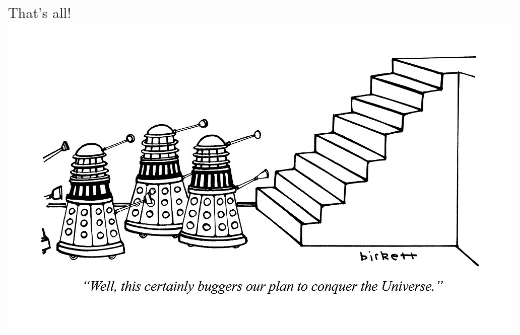 \documentclass{beamer}
\begin{document}
\begin{frame}{That's all!}
    \includegraphics[height=0.75\textheight,width=\textwidth]{images/robots.jpg}
\end{frame}
\end{document}
